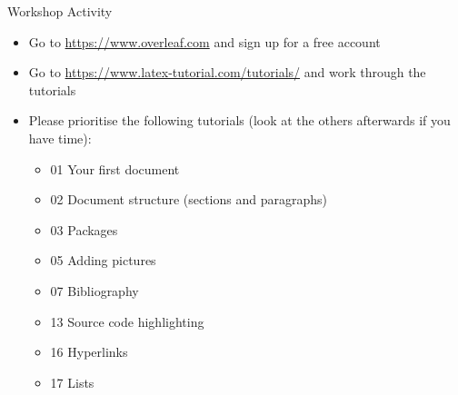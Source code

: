 \begin{frame}{Workshop Activity}
\begin{itemize}
	\item Go to \url{https://www.overleaf.com} and sign up for a free account
	\item Go to \url{https://www.latex-tutorial.com/tutorials/} and work through the tutorials
	\item Please prioritise the following tutorials (look at the others afterwards if you have time):
	    \begin{itemize}
            \item 01 Your first document
            \item 02 Document structure (sections and paragraphs)
            \item 03 Packages
            \item 05 Adding pictures
            \item 07 Bibliography
            \item 13 Source code highlighting
            \item 16 Hyperlinks
            \item 17 Lists
	    \end{itemize}
    \end{itemize}
\end{frame}


